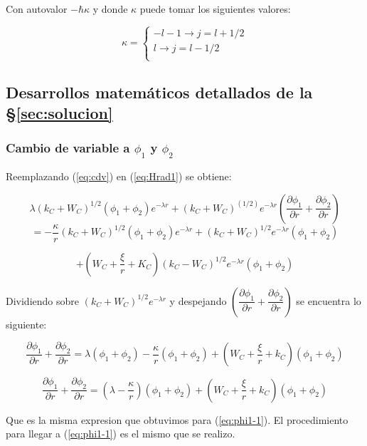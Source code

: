 \documentclass[a4paper, 12pt]{article} %
\begin{document}
Con autovalor $-\hbar \kappa$ y donde $\kappa$ puede tomar los siguientes
valores:

\[ \kappa = 
\begin{cases}
-l - 1 \rightarrow j = l + 1/2  \\
l \rightarrow j = l - 1/2 \\ 
\end{cases}
\]  


\subsection{Desarrollos matem\'aticos detallados de la \S \ref{sec:solucion}}\label{sec:pasoapaso}

\subsubsection{Cambio de variable a $\phi_1$ y $\phi_2$}

Reemplazando (\ref{eq:cdv}) en (\ref{eq:Hrad1})  se obtiene:

\[
\lambda (k_C + W_C)^{1/2}(\phi_1 + \phi_2)e^{-\lambda r} + (k_C + W_C)^(1/2)e^{-\lambda r}\left( \dfrac{\partial \phi_1}{\partial r} 
+ \dfrac{\partial \phi_2}{\partial r} \right)
\]
\[
 = - \dfrac{\kappa}{r}  (k_C + W_C)^{1/2}(\phi_1 + \phi_2)e^{-\lambda r} 
+ (k_C + W_C)^{1/2}e^{-\lambda r} (\phi_1 + \phi_2)
\]

\[
+ \left ( W_C + \dfrac{\xi}{r} + K_C \right )(k_C - W_C)^{1/2}e^{-\lambda r}(\phi_1 + \phi_2)
\]


Dividiendo sobre $(k_C + W_C)^{1/2}e^{-\lambda r}$ y despejando $\left( \dfrac{\partial \phi_1}{\partial r} 
+ \dfrac{\partial \phi_2}{\partial r} \right)$ se encuentra lo siguiente:

\[
\dfrac{\partial \phi_1}{\partial r} + \dfrac{\partial \phi_2}{\partial r} = \lambda (\phi_1 + \phi_2) - \dfrac{\kappa}{r}(\phi_1 + \phi_2)
+\left( W_C + \dfrac{\xi}{r} + k_C  \right)(\phi_1 + \phi_2) 
\]

\begin{equation}
\dfrac{\partial \phi_1}{\partial r} + \dfrac{\partial \phi_2}{\partial r} = \left ( \lambda - \dfrac{\kappa}{r} \right ) (\phi_1 + \phi_2)
+\left( W_C + \dfrac{\xi}{r} + k_C  \right)(\phi_1 + \phi_2) 
\end{equation}

Que es la misma expresion que obtuvimos para (\ref{eq:phi1-1}). El procedimiento para llegar a (\ref{eq:phi1-1}) es el mismo que se realizo.
\end{document}
